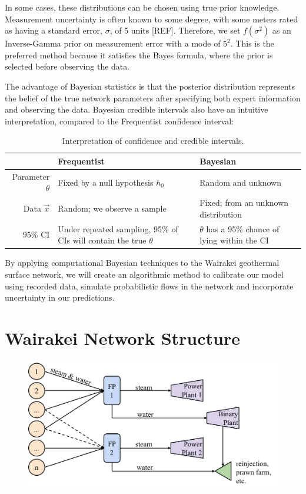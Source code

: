 \documentclass[a4paper, 12pt]{article}
\begin{document}
In some cases, these distributions can be chosen using true prior knowledge. Measurement uncertainty is often known to some degree, with some meters rated as having a standard error, $\sigma$, of 5 units [REF]. Therefore, we set $f(\sigma^2)$ as an Inverse-Gamma prior on measurement error with a mode of $5^2$. This is the preferred method because it satisfies the Bayes formula, where the prior is selected before observing the data.

The advantage of Bayesian statistics is that the posterior distribution represents the belief of the true network parameters after specifying both expert information and observing the data. Bayesian credible intervals also have an intuitive interpretation, compared to the Frequentist confidence interval:

\begin{table}[ht]
\centering
\begin{tabularx}{\linewidth}{rXX}
\hline
 & Frequentist & Bayesian \\ 
  \hline
Parameter $\theta$ & Fixed by a null hypothesis $h_0$ & Random and unknown \\\hline
Data $\vec{x}$ & Random; we observe a sample & Fixed; from an unknown distribution \\\hline
95\% CI & Under repeated sampling, 95\% of CIs will contain the true $\theta$ & $\theta$ has a 95\% chance of lying within the CI  \\
   \hline
\end{tabularx}
\caption{Interpretation of confidence and credible intervals.} 
\label{tab:ci}
\end{table}

By applying computational Bayesian techniques to the Wairakei geothermal surface network, we will create an algorithmic method to calibrate our model using recorded data, simulate probabilistic flows in the network and incorporate uncertainty in our predictions.

\section{Wairakei Network Structure}

\begin{figure}
  \centering
  \includegraphics[width=0.5\linewidth]{media/network_diagram}
  \label{fig:network_diagram}
\end{figure}
\end{document}
